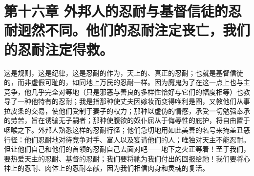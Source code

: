 
\section{第十六章 外邦人的忍耐与基督信徒的忍耐迥然不同。他们的忍耐注定丧亡，我们的忍耐注定得救。}

这是规则，这是纪律，这是忍耐的作为，天上的、真正的忍耐；也就是基督信徒的，而非虚假可耻的，如同地上万民的忍耐一样。因为魔鬼为了在这一点上也与主竞争，他几乎完全对等地（只是邪恶与善良的多样性恰好与它们的幅度相等）也教导了一种他特有的忍耐；我是指那种使丈夫因嫁妆而变得唯利是图，又教他们从事拉皮条的交易，使他们受制于妻子的权力；那种以虚伪的情感，承受一切勉强奉承的劳苦，旨在诱骗无子嗣者；那种使腹欲的奴仆屈从于侮辱性的庇护，将自由置于咽喉之下。外邦人熟悉这样的忍耐行径；他们急切地用如此美善的名号来掩盖丑恶行径：他们忍耐地对待竞争对手、富人以及宴请他们的人；唯独对天主不能忍耐。但让他们自己和他们的首领的忍耐自己去面对吧——地下之火正等着！至于我们，要热爱天主的忍耐、基督的忍耐；我们要将祂为我们付出的回报给祂！我们要将心神上的忍耐、肉体上的忍耐奉献，因为我们相信肉身和灵魂的复活。\par

